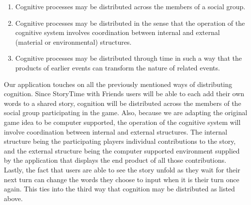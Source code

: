 \documentclass{sigchi}
\begin{document}
\begin{enumerate}[leftmargin=.5in,noitemsep]
\item Cognitive processes may be distributed across the members of a social group.
\item Cognitive processes may be distributed in the sense that the operation of the cognitive system involves coordination between internal and external (material or environmental) structures.
\item Cognitive processes may be distributed through time in such a way that the products of earlier events can transform the nature of related events. 
\end{enumerate}

Our application touches on all the previously mentioned ways of distributing cognition. Since StoryTime with Friends users will be able to each add their own words to a shared story, cognition will be distributed across the members of the social group participating in the game. Also, because we are adapting the original game idea to be computer supported, the operation of the cognitive system will involve coordination between internal and external structures. The internal structure being the participating players individual contributions to the story, and the external structure being the computer supported environment supplied by the application that displays the end product of all those contributions. Lastly, the fact that users are able to see the story unfold as they wait for their next turn can change the words they choose to input when it is their turn once again. This ties into the third way that cognition may be distributed as listed above.

\newpage
\end{document}
